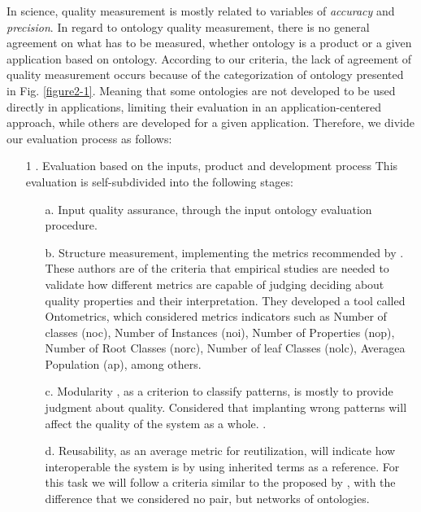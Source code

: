 In science, quality measurement is mostly related to variables of \textit{accuracy} and \textit{precision}.  In regard to ontology quality measurement, there is no general agreement on what has to be measured, whether ontology is a product or a given application based on ontology. According to our criteria, the   lack of agreement of quality measurement occurs because of the categorization of ontology presented in Fig. \ref{figure2-1}. Meaning that some ontologies are not developed to be used directly in applications, limiting their evaluation in an application-centered approach, while others are developed for a given application. Therefore, we divide our evaluation process as follows:


\begin{enumerate}
	
	\item[1].	 Evaluation based on the inputs, product and development process
	This evaluation is self-subdivided into the following stages:
	

	\begin{enumerate}
		
		\item[a.] Input quality assurance, through the input ontology evaluation procedure.
		
		\item[b.] Structure measurement, implementing the metrics recommended   by \cite{manouselis_exploring_2010}. These authors are of the criteria that empirical studies are needed to validate how different metrics are capable of judging deciding about quality properties and their interpretation. They developed a tool called Ontometrics, which considered metrics indicators such as Number of classes (noc), Number of Instances (noi), Number of Properties (nop), Number of Root Classes (norc), Number of leaf Classes (nolc), Averagea Population (ap), among others. 
		
		\item[c.] Modularity  , as a criterion to classify patterns, is mostly to provide judgment about quality.  Considered that implanting wrong patterns will affect the quality of the system as a whole. \cite{randelli_introducing_2010}.
		
		\item[d.] Reusability, as an average metric for reutilization, will indicate how interoperable   the system is by using inherited terms as a reference. For this task we will follow a criteria similar to the proposed by \cite{spiliopoulos_discovery_2010}, with the difference that we considered no pair, but networks of ontologies. 
		

\end{enumerate}
\end{enumerate}
